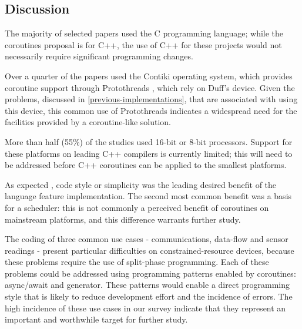 \subsection{Discussion}

\iffalse
A systematic mapping study was conducted into the use and implementation of coroutines on resource-constrained devices, following the guidelines of Kitchenham \cite{Kitchenham2004}, Kitchenham and Charters \cite{Kitchenham2007} and Petersen et al. \cite{Petersen2008}. The search included papers published in English since 2007, and yielded 553 unique documents, of which 35 were selected after application of inclusion and exclusion criteria.
\fi

The majority of selected papers used the C programming language; while the coroutines proposal \cite{ISO2017} is for C++, the use of C++ for these projects would not necessarily require significant programming changes.

Over a quarter of the papers used the Contiki \cite{Dunkels2004} operating system, which provides coroutine support through Protothreads \cite{Dunkels2006}, which rely on Duff’s device. Given the problems, discussed in \DIFdelbegin {}\DIFdelend \DIFaddbegin {}\DIFaddend \ref{previous-implementations}, that are associated with using this device, this common use of Protothreads indicates a widespread need for the facilities provided by a coroutine-like solution.

More than half (55\%) of the studies used 16-bit or 8-bit processors. Support for these platforms on leading C++ compilers is currently limited; this will need to be addressed before C++ coroutines can be applied to the smallest platforms.

As expected \cite{AspenCore2017, Skerrett2017}, code style or simplicity was the leading desired benefit of the language feature implementation. The second most common benefit was a basis for a scheduler: this is not commonly a perceived benefit of coroutines on mainstream platforms, and this difference warrants further study.

The coding of three common use cases - communications, data-flow and sensor readings - present particular difficulties on constrained-resource devices, because these problems require the use of split-phase programming. Each of these problems could be addressed using programming patterns enabled by coroutines: async/await and generator. These patterns would enable a direct programming style that is likely to reduce development effort and the incidence of errors. The high incidence of these use cases in our survey indicate that they represent an important and worthwhile target for further study.

